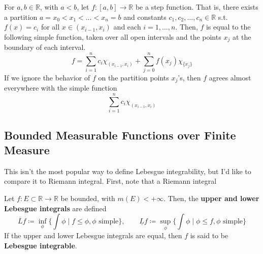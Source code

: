   \begin{example}
    For $a, b \in \mathbb{R}$, with $a < b$, let $f: [a, b] \longrightarrow \mathbb{R}$ be a step function. That is, there exists a partition $a = x_0 < x_1 < \ldots < x_n = b$ and constants $c_1, c_2, \ldots, c_n \in \mathbb{R}$ s.t. $f(x) = c_i$ for all $x \in (x_{i-1}, x_i)$ and each $i = 1, \ldots, n$. Then, $f$ is equal to the following simple function, taken over all open intervals and the points $x_j$ at the boundary of each interval. 
    \begin{equation}
      f = \sum_{i=1}^n c_i \chi_{(x_{i-1}, x_i)} + \sum_{j=0}^n f(x_j) \chi_{\{x_j\}}
    \end{equation}
    If we ignore the behavior of $f$ on the partition points $x_j$'s, then $f$ agrees almost everywhere with the simple function 
    \begin{equation}
      \sum_{i=1}^n c_i \chi_{(x_{i-1}, x_i)}
    \end{equation}
  \end{example} 

\subsection{Bounded Measurable Functions over Finite Measure} 

  This isn't the most popular way to define Lebesgue integrability, but I'd like to compare it to Riemann integral. First, note that a Riemann integral 

  \begin{definition}
    Let $f: E \subset \mathbb{R} \to \mathbb{R}$ be bounded, with $m(E) < +\infty$. Then, the \textbf{upper and lower Lebesgue integrals} are defined 
    \begin{equation}
      \overline{L} f \coloneqq \inf_{\phi} \bigg\{ \int \phi \; \bigg| \; f \leq \phi, \phi \text{ simple} \bigg\}, \qquad \underline{L} f \coloneqq \sup_{\phi} \bigg\{ \int \phi \; \bigg| \; \phi \leq f, \phi \text{ simple} \bigg\}
    \end{equation}
    If the upper and lower Lebesgue integrals are equal, then $f$ is said to be \textbf{Lebesgue integrable}.
  \end{definition}

